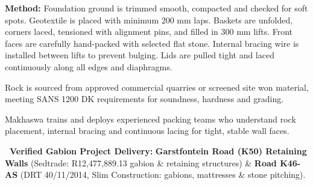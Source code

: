 \documentclass[a4paper,11pt]{article}
\begin{document}
\vspace{0.14cm}

\noindent
\begin{tcolorbox}[enhanced, colback=mhoffwhite, colframe=mhlightgray, boxrule=0.7pt, arc=4pt, left=8pt, right=8pt, top=6pt, bottom=6pt, borderline west={3pt}{0pt}{mhgold}, drop shadow=black!3]
    {\fontsize{7.8pt}{10.2pt}\selectfont\color{mhtext}
    \textbf{Method:} Foundation ground is trimmed smooth, compacted and checked for soft spots. Geotextile is placed with minimum 200 mm laps. Baskets are unfolded, corners laced, tensioned with alignment pins, and filled in 300 mm lifts. Front faces are carefully hand-packed with selected flat stone. Internal bracing wire is installed between lifts to prevent bulging. Lids are pulled tight and laced continuously along all edges and diaphragms.
    }
\end{tcolorbox}

\vfill

\noindent
\begin{minipage}[t]{0.485\textwidth}
    \begin{tcolorbox}[enhanced, colback=white, colframe=mhlightgray, boxrule=0.8pt, arc=4pt, title={\bfseries\color{white}\faTruckMonster\ Rock Logistics \& Supply}, colbacktitle=mhnavy, left=7pt, right=7pt, top=6pt, bottom=6pt, drop shadow=black!3]
        {\fontsize{7.8pt}{10.4pt}\selectfont\color{mhtext}
        Rock is sourced from approved commercial quarries or screened site won material, meeting SANS 1200 DK requirements for soundness, hardness and grading.
        }
    \end{tcolorbox}
\end{minipage}
\hfill
\begin{minipage}[t]{0.485\textwidth}
    \begin{tcolorbox}[enhanced, colback=white, colframe=mhlightgray, boxrule=0.8pt, arc=4pt, title={\bfseries\color{white}\faUsers\ Skilled Hand-Packing Labour}, colbacktitle=mhblue, left=7pt, right=7pt, top=6pt, bottom=6pt, drop shadow=black!3]
        {\fontsize{7.8pt}{10.4pt}\selectfont\color{mhtext}
        Makhaswa trains and deploys experienced packing teams who understand rock placement, internal bracing and continuous lacing for tight, stable wall faces.
        }
    \end{tcolorbox}
\end{minipage}

\vfill

\noindent
\begin{tcolorbox}[enhanced, colback=white, colframe=mhnavy, boxrule=0.8pt, arc=3pt, left=8pt, right=8pt, top=6pt, bottom=6pt, drop shadow=black!3]
    {\fontsize{8pt}{10.6pt}\selectfont\color{mhnavy}\bfseries\faCheckCircle\ Verified Gabion Project Delivery:}\quad
    {\fontsize{8pt}{10.6pt}\selectfont\color{mhtext}
    \textbf{Garstfontein Road (K50) Retaining Walls} (Sedtrade: R12,477,889.13 gabion \& retaining structures) \& \textbf{Road K46-AS} (DRT 40/11/2014, Slim Construction: gabions, mattresses \& stone pitching).
    }
\end{tcolorbox}
\end{document}
